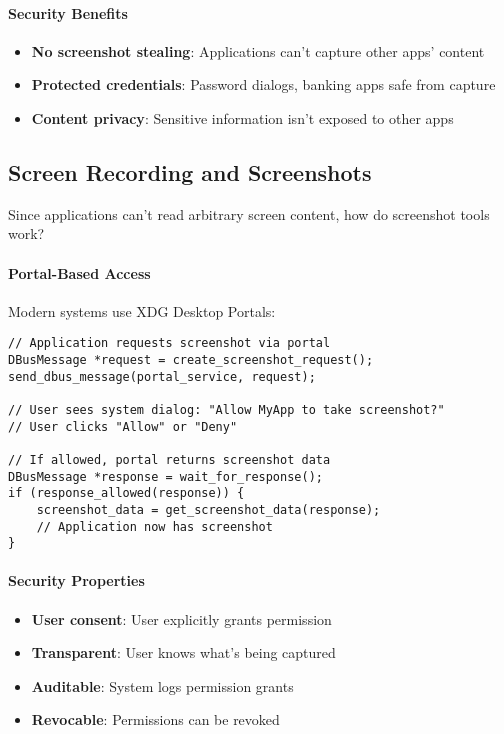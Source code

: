 \paragraph{Security Benefits}

\begin{itemize}
    \item \textbf{No screenshot stealing}: Applications can't capture other apps' content
    \item \textbf{Protected credentials}: Password dialogs, banking apps safe from capture
    \item \textbf{Content privacy}: Sensitive information isn't exposed to other apps
\end{itemize}

\subsection{Screen Recording and Screenshots}

Since applications can't read arbitrary screen content, how do screenshot tools work?

\paragraph{Portal-Based Access}

Modern systems use XDG Desktop Portals:

\begin{lstlisting}[style=cstyle, caption=Screenshot via Portal (D-Bus pseudocode)]
// Application requests screenshot via portal
DBusMessage *request = create_screenshot_request();
send_dbus_message(portal_service, request);

// User sees system dialog: "Allow MyApp to take screenshot?"
// User clicks "Allow" or "Deny"

// If allowed, portal returns screenshot data
DBusMessage *response = wait_for_response();
if (response_allowed(response)) {
    screenshot_data = get_screenshot_data(response);
    // Application now has screenshot
}
\end{lstlisting}

\paragraph{Security Properties}

\begin{itemize}
    \item \textbf{User consent}: User explicitly grants permission
    \item \textbf{Transparent}: User knows what's being captured
    \item \textbf{Auditable}: System logs permission grants
    \item \textbf{Revocable}: Permissions can be revoked
\end{itemize}

